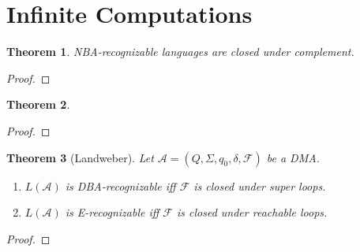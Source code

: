 \documentclass{article}
\newtheorem{theorem}{Theorem}
\begin{document}
\section{Infinite Computations}
\begin{theorem}
\label{nba_complement}
	NBA-recognizable languages are closed under complement.
\end{theorem}
\begin{proof}
\end{proof}


\vspace{1cm}
\begin{theorem}
\label{ltl_to_nba}

\end{theorem}
\begin{proof}
\end{proof}


\vspace{1cm}
\begin{theorem}[Landweber]
\label{landweber}
	Let $\mathcal{A} = (Q, \Sigma, q_0, \delta, \mathcal{F})$ be a DMA. 
	\begin{enumerate}
		\item $L(\mathcal{A})$ is DBA-recognizable iff $\mathcal{F}$ is closed under super loops.
		\item $L(\mathcal{A})$ is E-recognizable iff $\mathcal{F}$ is closed under reachable loops.
	\end{enumerate}
\end{theorem}
\begin{proof}
\end{proof}
\end{document}
